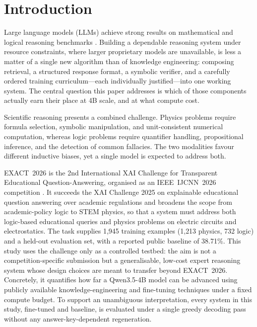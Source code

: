\documentclass[APA,twocolumn]{USG}
\newcommand{\basemodelname}{Qwen3.5-4B}
\newcommand{\dataset}{EXACT~2026}
\begin{document}
\maketitle

\section{Introduction}\label{sec1}

Large language models (LLMs) achieve strong results on mathematical and
logical reasoning benchmarks \citep{Wei2022,Wang2023sc,Kojima2022}. Building a
dependable reasoning system under resource constraints, where larger proprietary
models are unavailable, is less a matter of a single new algorithm than of
knowledge engineering: composing retrieval, a structured response format, a
symbolic verifier, and a carefully ordered training curriculum---each
individually justified---into one working system. The central question this paper
addresses is which of those components actually earn their place at 4B scale, and
at what compute cost.

Scientific reasoning presents a combined challenge. Physics problems require
formula selection, symbolic manipulation, and unit-consistent numerical
computation, whereas logic problems require quantifier handling, propositional
inference, and the detection of common fallacies. The two modalities favour
different inductive biases, yet a single model is expected to address both.

\dataset{} is the 2nd International XAI Challenge for Transparent Educational
Question-Answering, organised as an IEEE~IJCNN~2026 competition
\citep{EXACT2026}. It succeeds the XAI Challenge 2025 on explainable educational
question answering over academic regulations \citep{Nguyen2025XAIChallenge} and
broadens the scope from academic-policy logic to STEM physics, so that a system
must address both logic-based educational queries and physics problems on
electric circuits and electrostatics. The task supplies
1{,}945 training examples (1{,}213 physics, 732 logic) and a held-out evaluation
set, with a reported public baseline of 38.71\%. This study uses the challenge
only as a controlled testbed: the aim is not a competition-specific submission but
a generalisable, low-cost expert reasoning system whose design choices are meant
to transfer beyond \dataset{}. Concretely, it quantifies how far a
\basemodelname{} model can be advanced using publicly available
knowledge-engineering and fine-tuning techniques under a fixed compute budget. To
support an unambiguous interpretation, every system in this study, fine-tuned and
baseline, is evaluated under a single greedy decoding pass without any
answer-key-dependent regeneration.
\end{document}
